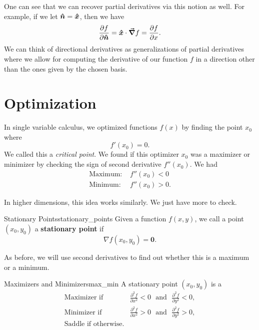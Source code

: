                                                
                        One can see that we can recover partial derivatives via this notion as well.  For example, if we let $\boldsymbol{\hat{n}} = \boldsymbol{\hat{x}}$, then we have
                        \[
                        \frac{\partial f}{\partial \boldsymbol{\hat{n}}} = \boldsymbol{\hat{x}} \cdot \boldsymbol{\vec{\nabla}} f = \frac{\partial f}{\partial x}.
                        \]
                        We can think of directional derivatives as generalizations of partial derivatives where we allow for computing the derivative of our function $f$ in a direction other than the ones given by the chosen basis.
                        
                        \section{Optimization}
                        In single variable calculus, we optimized functions $f(x)$ by finding the point $x_0$ where 
                        \[
                        f'(x_0)=0.
                        \]
                        We called this a \emph{critical point}. We found if this optimizer $x_0$ was a maximizer or minimizer by checking the sign of second derivative $f''(x_0)$. We had
                        \begin{align*}
                            \textrm{Maximum: }& f''(x_0)<0\\
                            \textrm{Minimum: }& f''(x_0)>0.
                        \end{align*}
                        
                        In higher dimensions, this idea works similarly. We just have more to check. 
                        
                        \begin{df}{Stationary Points}{stationary_points}
                        Given a function $f(x,y)$, we call a point $(x_0,y_0)$ a \textbf{stationary point} if 
                        \[
                        \nabla f(x_0,y_0) = \mathbf{0}.
                        \]
                        \end{df}
                        
                        As before, we will use second derivatives to find out whether this is a maximum or a minimum.
                        
                        \begin{prop}{Maximizers and Minimizers}{max_min}
                        A stationary point $(x_0,y_0)$ is a 
                        \begin{align*}
                            \textrm{Maximizer if~ }& \frac{\partial^2 f}{\partial x^2} <0 \textrm{ ~and~ } \frac{\partial^2 f}{\partial y^2}<0,\\
                            \textrm{Minimizer if~ }& \frac{\partial^2 f}{\partial x^2} >0 \textrm{ ~and~ } \frac{\partial^2 f}{\partial y^2}>0,\\
                            \textrm{Saddle if otherwise.}
                        \end{align*}
                        \end{prop}
                        
